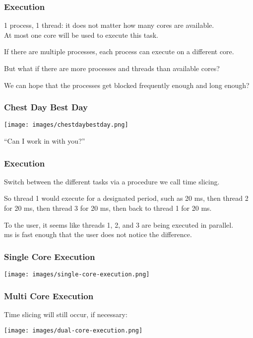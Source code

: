 \begin{frame}
	\frametitle{Execution}

	1 process, 1 thread: it does not matter how many cores are available.\\
	\quad At most one core will be used to execute this task.

	If there are multiple processes, each process can execute on a different core.

	But what if there are more processes and threads than available cores?

	We can hope that the processes get blocked frequently enough and long enough?



\end{frame}


\begin{frame}
	\frametitle{Chest Day Best Day}

	\begin{center}
		\texttt{[image: images/chestdaybestday.png]}
	\end{center}

	``Can I work in with you?''

\end{frame}


\begin{frame}
	\frametitle{Execution}


	Switch between the different tasks via a procedure we call \alert{time slicing}.

	So thread 1 would execute for a designated period, such as 20 ms, then thread 2 for 20 ms, then thread 3 for 20 ms, then back to thread 1 for 20 ms.

	To the user, it seems like threads 1, 2, and 3 are being executed in parallel.\\
	 ms is fast enough that the user does not notice the difference.

\end{frame}


\begin{frame}
	\frametitle{Single Core Execution}

	\begin{center}
		\texttt{[image: images/single-core-execution.png]}
	\end{center}

\end{frame}


\begin{frame}
	\frametitle{Multi Core Execution}

	Time slicing will still occur, if necessary:

	\begin{center}
		\texttt{[image: images/dual-core-execution.png]}
	\end{center}


\end{frame}




